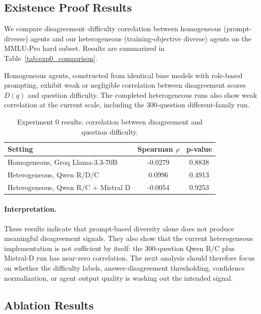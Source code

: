 \documentclass{article}
\begin{document}
\subsection{Existence Proof Results}

We compare disagreement–difficulty correlation between homogeneous (prompt-diverse) agents and our heterogeneous (training-objective diverse) agents on the MMLU-Pro hard subset. Results are summarized in Table~\ref{tab:exp0_comparison}.

Homogeneous agents, constructed from identical base models with role-based prompting, exhibit weak or negligible correlation between disagreement scores $D(q)$ and question difficulty. The completed heterogeneous runs also show weak correlation at the current scale, including the 300-question different-family run.

\begin{table}[h]
\centering
\caption{Experiment 0 results: correlation between disagreement and question difficulty.}
\label{tab:exp0_comparison_results}
\begin{tabular}{lcc}
\toprule
\textbf{Setting} & \textbf{Spearman $\rho$} & \textbf{p-value} \\
\midrule
Homogeneous, Groq Llama-3.3-70B & -0.0279 & 0.8838 \\
Heterogeneous, Qwen R/D/C & 0.0996 & 0.4913 \\
Heterogeneous, Qwen R/C + Mistral D & -0.0054 & 0.9253 \\
\bottomrule
\end{tabular}
\end{table}

\paragraph{Interpretation.}
These results indicate that prompt-based diversity alone does not produce meaningful disagreement signals. They also show that the current heterogeneous implementation is not sufficient by itself: the 300-question Qwen R/C plus Mistral-D run has near-zero correlation. The next analysis should therefore focus on whether the difficulty labels, answer-disagreement thresholding, confidence normalization, or agent output quality is washing out the intended signal.

\subsection{Ablation Results}
\end{document}
